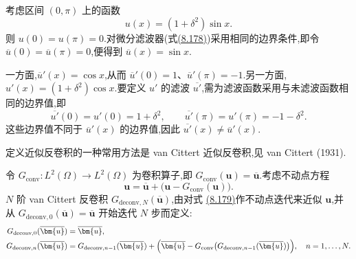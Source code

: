 \begin{example}[有界区域上微分滤波器的交换误差]
\label{ex:les-differential-filter-commutation-error}
考虑区间 $(0,\pi)$ 上的函数
\[
 u(x)=(1+\delta^2)\sin x.
\]
则 $u(0)=u(\pi)=0$.对微分滤波器(式\hyperref[eq:les-adm-differential-filter]{(8.178)})采用相同的边界条件,即令 $\overline{u}(0)=\overline{u}(\pi)=0$,便得到 $\overline{u}(x)=\sin x$.

一方面,$\overline{u}'(x)=\cos x$,从而 $\overline{u}'(0)=1$、$\overline{u}'(\pi)=-1$.另一方面,$u'(x)=(1+\delta^2)\cos x$.要定义 $u'$ 的滤波 $\overline{u'}$,需为滤波函数采用与未滤波函数相同的边界值,即
\[
 \overline{u'}(0)=u'(0)=1+\delta^2,
 \qquad
 \overline{u'}(\pi)=u'(\pi)=-1-\delta^2.
\]
这些边界值不同于 $\overline{u}'(x)$ 的边界值,因此 $\overline{u'}(x)\ne\overline{u}'(x)$.
\end{example}
\begin{note}
\label{note:van-cittert-approximate-deconvolution}
定义近似反卷积的一种常用方法是 van Cittert 近似反卷积,见 van Cittert (1931).

令 $G_{\mathrm{conv}}:L^2(\Omega)\to L^2(\Omega)$ 为卷积算子,即
$G_{\mathrm{conv}}(\bm{u})=\overline{\bm{u}}$.考虑不动点方程
\begin{equation}\label{eq:van-cittert-fixed-point}
 \bm{u}
 =\overline{\bm{u}}
  +\bigl(\bm{u}-G_{\mathrm{conv}}(\bm{u})\bigr).
\end{equation}
$N$ 阶 van Cittert 反卷积 $G_{\mathrm{deconv},N}(\overline{\bm{u}})$,由对式
\hyperref[eq:van-cittert-fixed-point]{(8.179)}作不动点迭代来近似 $\bm{u}$,并从
$G_{\mathrm{deconv},0}(\overline{\bm{u}})=\overline{\bm{u}}$ 开始迭代 $N$ 步而定义:
\begin{equation}\label{eq:van-cittert-iteration}
\begin{aligned}
 G_{\mathrm{deconv},0}(\overline{\bm{u}})
 &=\overline{\bm{u}},\\
 G_{\mathrm{deconv},n}(\overline{\bm{u}})
 &=G_{\mathrm{deconv},n-1}(\overline{\bm{u}})
   +\Bigl(\overline{\bm{u}}
    -G_{\mathrm{conv}}\bigl(
     G_{\mathrm{deconv},n-1}(\overline{\bm{u}})\bigr)\Bigr),
 \quad n=1,\ldots,N.
\end{aligned}
\end{equation}
\end{note}

